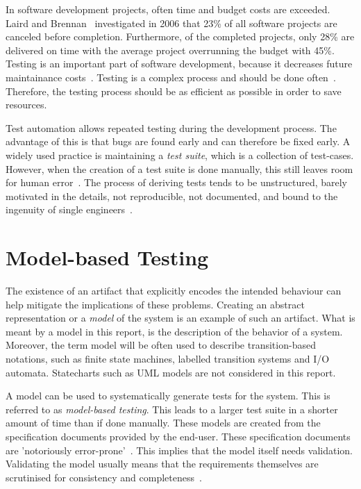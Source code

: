 In software development projects, often time and budget costs are exceeded. Laird and Brennan~\cite{Laird:SoftwareMeasurement} investigated in 2006 that 23\% of all software projects are canceled before completion. Furthermore, of the completed projects, only 28\% are delivered on time with the average project overrunning the budget with 45\%. Testing is an important part of software development, because it decreases future maintainance costs~\cite{McConnell:testing}. Testing is a complex process and should be done often~\cite{Pol:testing}. Therefore, the testing process should be as efficient as possible in order to save resources.

Test automation allows repeated testing during the development process. The advantage of this is that bugs are found early and can therefore be fixed early.  A widely used practice is maintaining a \textit{test suite}, which is a collection of test-cases. However, when the creation of a test suite is done manually, this still leaves room for human error~\cite{Blackburn:testing}. The process of deriving tests tends to be unstructured, barely motivated in the details, not reproducible, not documented, and bound to the ingenuity of single engineers~\cite{Utting:MBTTaxonomy}.

\section{Model-based Testing}
The existence of an artifact that explicitly encodes the intended behaviour can help mitigate the implications of these problems. Creating an abstract representation or a \textit{model} of the system is an example of such an artifact. What is meant by a model in this report, is the description of the behavior of a system. Moreover, the term model will be often used to describe transition-based notations, such as finite state machines, labelled transition systems and I/O automata. Statecharts such as UML models are not considered in this report. 

A model can be used to systematically generate tests for the system. This is referred to as \textit{model-based testing}. This leads to a larger test suite in a shorter amount of time than if done manually. These models are created from the specification documents provided by the end-user. These specification documents are 'notoriously error-prone'~\cite{McCabe:testing}. This implies that the model itself needs validation. Validating the model usually means that the requirements themselves are scrutinised for consistency and completeness~\cite{Utting:MBTTaxonomy}.

